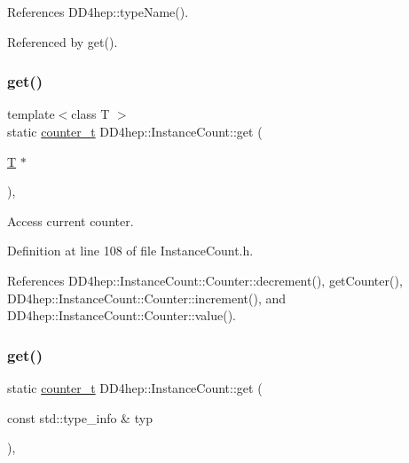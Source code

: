 References D\+D4hep\+::type\+Name().



Referenced by get().

\hypertarget{struct_d_d4hep_1_1_instance_count_a072aeb0f2392224316c4aac3433f0068}{}\label{struct_d_d4hep_1_1_instance_count_a072aeb0f2392224316c4aac3433f0068} 
\subsubsection{\texorpdfstring{get()}{get()}\hspace{0.1cm}{\footnotesize\ttfamily [1/3]}}
{\footnotesize\ttfamily template$<$class T $>$ \\
static \hyperlink{struct_d_d4hep_1_1_instance_count_ae81dc0c76b135425e14b6dc38262a727}{counter\+\_\+t} D\+D4hep\+::\+Instance\+Count\+::get (\begin{DoxyParamCaption}\item[{\hyperlink{class_t}{T} $\ast$}]{ }\end{DoxyParamCaption})\hspace{0.3cm}{\ttfamily [inline]}, {\ttfamily [static]}}



Access current counter. 



Definition at line 108 of file Instance\+Count.\+h.



References D\+D4hep\+::\+Instance\+Count\+::\+Counter\+::decrement(), get\+Counter(), D\+D4hep\+::\+Instance\+Count\+::\+Counter\+::increment(), and D\+D4hep\+::\+Instance\+Count\+::\+Counter\+::value().

\hypertarget{struct_d_d4hep_1_1_instance_count_a1b6de9faa3cda69498c13c07ea0f289c}{}\label{struct_d_d4hep_1_1_instance_count_a1b6de9faa3cda69498c13c07ea0f289c} 
\subsubsection{\texorpdfstring{get()}{get()}\hspace{0.1cm}{\footnotesize\ttfamily [2/3]}}
{\footnotesize\ttfamily static \hyperlink{struct_d_d4hep_1_1_instance_count_ae81dc0c76b135425e14b6dc38262a727}{counter\+\_\+t} D\+D4hep\+::\+Instance\+Count\+::get (\begin{DoxyParamCaption}\item[{const std\+::type\+\_\+info \&}]{typ }\end{DoxyParamCaption})\hspace{0.3cm}{\ttfamily [inline]}, {\ttfamily [static]}}



